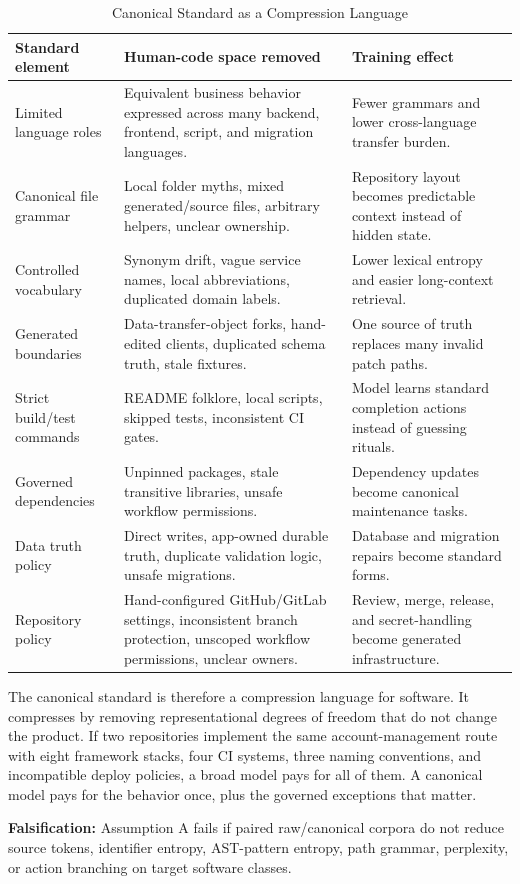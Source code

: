 \begin{table}[t]
\caption{Canonical Standard as a Compression Language}
\label{tab:standardcompression}
\centering
\footnotesize
\begin{tabularx}{\textwidth}{p{}X X}
\toprule
Standard element & Human-code space removed & Training effect \\
\midrule
Limited language roles & Equivalent business behavior expressed across many backend, frontend, script, and migration languages. & Fewer grammars and lower cross-language transfer burden. \\
Canonical file grammar & Local folder myths, mixed generated/source files, arbitrary helpers, unclear ownership. & Repository layout becomes predictable context instead of hidden state. \\
Controlled vocabulary & Synonym drift, vague service names, local abbreviations, duplicated domain labels. & Lower lexical entropy and easier long-context retrieval. \\
Generated boundaries & Data-transfer-object forks, hand-edited clients, duplicated schema truth, stale fixtures. & One source of truth replaces many invalid patch paths. \\
Strict build/test commands & README folklore, local scripts, skipped tests, inconsistent CI gates. & Model learns standard completion actions instead of guessing rituals. \\
Governed dependencies & Unpinned packages, stale transitive libraries, unsafe workflow permissions. & Dependency updates become canonical maintenance tasks. \\
Data truth policy & Direct writes, app-owned durable truth, duplicate validation logic, unsafe migrations. & Database and migration repairs become standard forms. \\
Repository policy & Hand-configured GitHub/GitLab settings, inconsistent branch protection, unscoped workflow permissions, unclear owners. & Review, merge, release, and secret-handling become generated infrastructure. \\
\bottomrule
\end{tabularx}
\end{table}

The canonical standard is therefore a compression language for software. It compresses by removing representational degrees of freedom that do not change the product. If two repositories implement the same account-management route with eight framework stacks, four CI systems, three naming conventions, and incompatible deploy policies, a broad model pays for all of them. A canonical model pays for the behavior once, plus the governed exceptions that matter.

\textbf{Falsification:} Assumption A fails if paired raw/canonical corpora do not reduce source tokens, identifier entropy, AST-pattern entropy, path grammar, perplexity, or action branching on target software classes.

